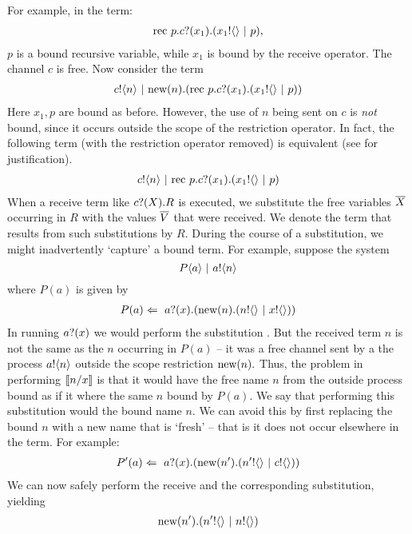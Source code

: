 	For example, in the term:
	\begin{align}
		\text{rec }{p}.{c}?({x_1}).({x_1}!\langle{}\rangle \ |\  p),
	\end{align}
	$p$ is a bound recursive variable, while $x_1$ is bound by the receive operator. 
	The channel $c$ is free.  
Now consider the term
	\begin{align}
		{c}!\langle{n}\rangle \ |\  \text{new}({n}).(\text{rec }{p}.{c}?({x_1}).({x_1}!\langle{}\rangle \ |\  p))
	\end{align}
	Here $x_1, p$ are bound as before.  
However, the use of $n$ being sent on $c$ is \emph{not} bound, since it occurs outside the scope of the restriction operator.  
In fact, the following term (with the restriction operator removed) is equivalent (see  for justification).
	\begin{align}
		{c}!\langle{n}\rangle \ |\  \text{rec }{p}.{c}?({x_1}).({x_1}!\langle{}\rangle \ |\  p)
	\end{align}
	When a receive term like ${c}?({X}).R$ is executed, we substitute the free variables $\overline{X}$ occurring in $R$ with the values $\overline{V}$ that were received.  
We denote the term that results from such substitutions by $R$.  
During the course of a substitution, we might inadvertently `capture' a bound term.  
For example, suppose the system
\[
	P\langle a\rangle \ |\  {a}!\langle{n}\rangle\\
\]
where $P(a)$ is given by
\begin{align}\label{subs_processpa}
	P(a) \Leftarrow\  {a}?({x}).(\text{new}({n}).({n}!\langle{}\rangle \ |\  {x}!\langle{}\rangle))
\end{align}
In running ${a}?({x})$ we would perform the substitution .
But the received term $n$ is not the same as the $n$ occurring in $P(a)$ -- it was a free channel sent by a the process ${a}!\langle{n}\rangle$ outside the scope restriction $\text{new}({n}).$  Thus, the problem in performing $\llbracket{n}/{x}\rrbracket$ is that it would have the free name $n$ from the outside process bound as if it where the same $n$ bound by $P(a)$.  
We say that performing this substitution would  the bound name $n$.  
We can avoid this by first replacing the bound $n$ with a new name that is `fresh' -- that is it does not occur elsewhere in the term.  
For example:
\begin{align}
	P{'}(a) \Leftarrow\  {a}?({x}).(\text{new}({n'}).({n'}!\langle{}\rangle \ |\  {c}!\langle{}\rangle))
\end{align}
We can now safely perform the receive and the corresponding substitution, yielding
\begin{align}
	\text{new}({n'}).({n'}!\langle{}\rangle \ |\  {n}!\langle{}\rangle)
\end{align}
